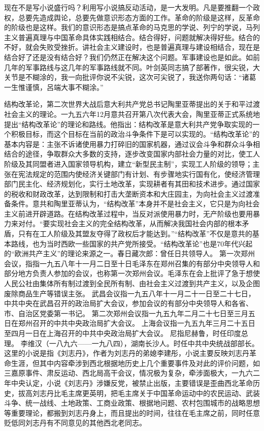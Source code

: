 现在不是写小说盛行吗？利用写小说搞反动活动，是一大发明。凡是要推翻一个政权，总要先造成舆论，总要先做意识形态方面的工作。革命的阶级是这样，反革命的阶级也是这样。我们的意识形态是搞点革命的马克思的学说、列宁的学说，马列主义普遍真理与中国革命具体实践相结合。结合得好，问题就解决得好些。结合的不好，就会失败受挫折。讲社会主义建设时，也是普遍真理与建设相结合，现在是结合好了还是没有结合好？我们仍然正在解决这个问题。军事建设也是如此。如前几年的军事路线与这几年的军事路线就不同。叶剑英同志搞了部著作，很尖锐，大关节是不糊涂的，我一向批评你说不尖锐，这次可尖锐了，我送你两句话：“诸葛一生惟谨慎，呂端大事不糊涂。”

\begin{maonote}
结构改革论，第二次世界大战后意大利共产党总书记陶里亚蒂提出的关于和平过渡社会主义的理论。一九五六年12月意共召开第八次代表大会，陶里亚蒂正式系统地提出“结构改革论”的理论和路线。他指出：结构改革是意大利共产党争取实现的一个积极目标，而这个目标在当前的政治斗争条件下是可以实现的。“结构改革论”的基本内容是：主张不诉诸使用暴力打碎旧的国家机器，通过议会斗争和群众斗争相结合的途径，争取群众大多数的支持，逐步改变国家内部社会力量的对比，使工人阶级及其同盟者进入国家领导机构，建立“新型民主制”，实现工人阶级的领导；主张在宪法规定的范围内使经济关键部门有计划、有步骤地实行国有化，使经济管理部门民主化、经济规划化，实行土地改革，实现耕者有其田和技术进步。通过国家的税收和财政改革，达到限制和打击大垄断资本和大庄园主，为向社会主义过渡准备条件。意共和陶里亚蒂认为，“结构改革”本身并不是社会主义，它只是为向社会主义前进开辟道路。在结构改革过程中，当反对派使用暴力时，无产阶级也要用暴力来对付。“要实现社会主义的完全结构改革，从而解决我国社会内部的根本矛盾，只有在工人阶级及其盟友夺得了政权后才能达到。”“结构改革”不仅是意共的基本路线，也为当时西欧一些国家的共产党所接受。“结构改革论”也是70年代兴起的“欧洲共产主义”的理论来源之一。春日藏次郎：曾任日共领导人。
第一次郑州会议，指指一九五八年十一月二日至十日毛泽东在郑州召集的有部分中央领导人和部分地方负责人参加的会议，也称第一次郑州会议。毛泽东在会上批评了急于想使人民公社由集体所有制过渡到全民所有制、由社会主义过渡到共产主义，以及企图废除商品生产等错误主张。
武昌会议指一九五八年十一月二十一日至二十七日，中共中央在武昌召开的政治局扩大会议，参加会议的有部分中央领导人和各省、市、自治区党委第一书记。
第二次郑州会议指一九五九年二月二十七日至三月五日在郑州召开的中共中央政治局扩大会议。
上海会议指一九五九年三月二十五日至四月一日在上海召开的中共中央政治局扩大会议。
尼指尼赫鲁，时任印度总理。
李维汉（一八九六——一九八四），湖南长沙人。时任中共中央统战部部长。
这里的小说是指《刘志丹》，作者为刘志丹的弟媳李建彤，小说主要反映刘志丹革命生涯，但其中内容牵涉到西北根据地历史上几个重要事件及对此的评价问题，如三嘉原事件、肃反运动、西北局高干会议，情况极为复杂，牵涉面极大，一九六二年中央认定，小说《刘志丹》涉嫌反党，被禁止出版，主要错误是歪曲西北革命历史，拔高刘志丹比毛主席更英明，把毛主席关于中国革命运动中的农民运动、武装斗争、统一战线、土地政策、工商业政策、根据地问题、农村包围城市的战略思想等重要理论，都搬到刘志丹身上，而且提出的时间，往往在毛主席之前，同时任意贬低同刘志丹有不同意见的其他西北老同志。


\end{maonote}
